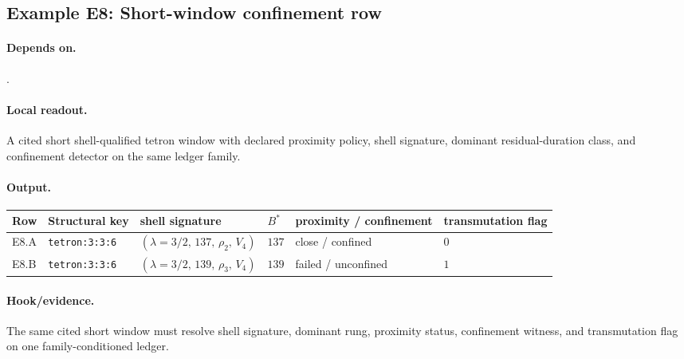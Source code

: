 \subsection{Example E8: Short-window confinement row}\label{ex:e8}
\paragraph{Depends on.} .
\paragraph{Local readout.} A cited short shell-qualified tetron window with declared proximity policy, shell signature, dominant residual-duration class, and confinement detector on the same ledger family.
\paragraph{Output.}
{\footnotesize
\begin{center}
\begin{tabular}{@{}llllll@{}}
\toprule
Row & Structural key & shell signature & $B^*$ & proximity / confinement & transmutation flag \\
\midrule
E8.A & \texttt{tetron:3:3:6} & $(\lambda\!=\!3/2,\,137,\,\rho_2,\,V_4)$ & $137$ & close / confined & $0$ \\
E8.B & \texttt{tetron:3:3:6} & $(\lambda\!=\!3/2,\,139,\,\rho_3,\,V_4)$ & $139$ & failed / unconfined & $1$ \\
\bottomrule
\end{tabular}
\end{center}}
\paragraph{Hook/evidence.} The same cited short window must resolve shell signature, dominant rung, proximity status, confinement witness, and transmutation flag on one family-conditioned ledger.
